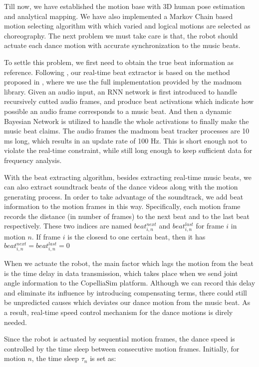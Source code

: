 \documentclass[UTF8,a4paper]{article}
\begin{document}
	\noindent Till now, we have established the motion base with 3D human pose estimation and analytical mapping. We have also implemented a Markov Chain based motion selecting algorithm with which varied and logical motions are selected as choreography. The next problem we must take care is that, the robot should actuate each dance motion with accurate synchronization to the music beats.

	To settle this problem, we first need to obtain the true beat information as reference. Following \cite{bi2018real}, our real-time beat extractor is based on the method proposed in \cite{bock2014multi}, where we use the full implementation provided by the madmom \cite{bock2016madmom} library. Given an audio input, an RNN network is first introduced to handle recursively cutted audio frames, and produce beat activations which indicate how possible an audio frame corresponds to a music beat. And then a dynamic Bayesian Network is utilized to handle the whole activations to finally make the music beat claims. The audio frames the madmom beat tracker processes are 10 ms long, which results in an update rate of 100 Hz. This is short enough not to violate the real-time constraint, while still long enough to keep sufficient data for frequency analysis.

	With the beat extracting algorithm, besides extracting real-time music beats, we can also extract soundtrack beats of the dance videos along with the motion generating process. In order to take advantage of the soundtrack, we add beat information to the motion frames in this way. Specifically, each motion frame records the distance (in number of frames) to the next beat and to the last beat respectively. These two indices are named $beat^{next}_{i,n}$ and $beat^{last}_{i,n}$ for frame $i$ in motion $n$. If frame $i$ is the closesd to one certain beat, then it has $beat^{next}_{i,n} = beat^{last}_{i,n} = 0$

	When we actuate the robot, the main factor which lags the motion from the beat is the time delay in data transmission, which takes place when we send joint angle information to the CopelliaSim platform. Although we can record this delay and eliminate its influence by introducing compensating terms, there could still be unpredicted causes which deviates our dance motion from the music beat. As a result, real-time speed control mechanism for the dance motions is direly needed.

	Since the robot is actuated by sequential motion frames, the dance speed is controlled by the time sleep between consecutive motion frames. Initially, for motion $n$, the time sleep $\tau_n$ is set as:
\end{document}
